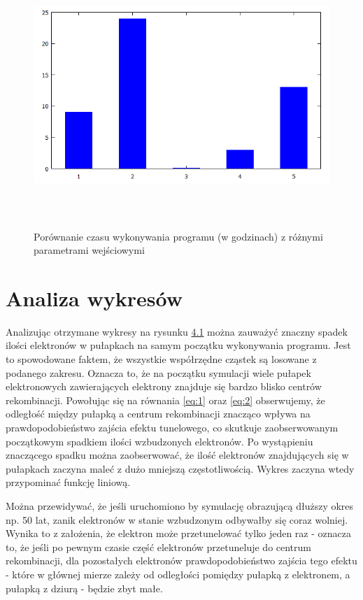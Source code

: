 \begin{figure}[H]
\centering
\includegraphics[width=17cm, height = 10cm]{czas}
\caption{Porównanie czasu wykonywania programu (w godzinach) z różnymi parametrami wejściowymi}
\label{rys:2}
\end{figure}



\section{Analiza wykresów}
Analizując otrzymane wykresy  na rysunku \hyperref[rys:1]{4.1} można zauważyć znaczny spadek ilości elektronów w pułapkach na samym początku wykonywania programu. Jest to spowodowane faktem, że wszystkie współrzędne cząstek są losowane z podanego zakresu. Oznacza to, że na początku symulacji wiele pułapek elektronowych zawierających elektrony znajduje się bardzo blisko centrów rekombinacji. Powołując się na równania \ref{eq:1} oraz \ref{eq:2} obserwujemy, że odległość między pułapką a centrum rekombinacji znacząco wpływa na prawdopodobieństwo zajścia efektu tunelowego, co skutkuje zaobserwowanym początkowym spadkiem ilości wzbudzonych elektronów. Po wystąpieniu znaczącego spadku można zaobserwować, że ilość elektronów znajdujących się w pułapkach zaczyna maleć z dużo mniejszą częstotliwością. Wykres zaczyna wtedy przypominać funkcję liniową. 

Można przewidywać, że jeśli uruchomiono by symulację obrazującą dłuższy okres np. 50 lat, zanik elektronów w stanie wzbudzonym odbywałby się coraz wolniej. Wynika to z założenia, że elektron może przetunelować tylko jeden raz - oznacza to, że jeśli po pewnym czasie część elektronów przetuneluje do centrum rekombinacji, dla pozostałych elektronów prawdopodobieństwo zajścia tego efektu - które w głównej mierze zależy od odległości pomiędzy pułapką z elektronem, a pułapką z dziurą - będzie zbyt małe.

